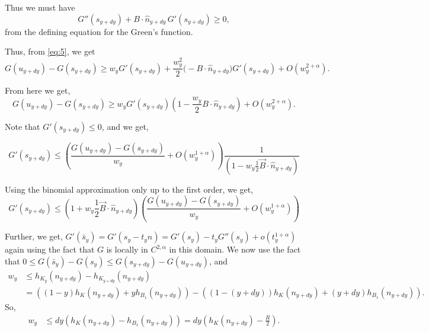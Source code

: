 \documentclass{article}
\theoremstyle{plain}
\theoremstyle{definition}
\theoremstyle{plain}
\begin{document}
Thus we must have
\[
G''(s_{y+dy}) + B \cdot \hat n_{y+dy} \, G'(s_{y+dy}) \ge 0,
\]
from the defining equation for the Green's function.

Thus, from \eqref{eq:5}, we get
\begin{equation}
G(u_{y+dy}) - G(s_{y+dy})
\ge w_y G'(s_{y+dy})
+ \frac{w_y^2}{2} \big(- B \cdot \hat n_{y+dy}\big) G'(s_{y+dy})
+ O(w_y^{2+\alpha}).
\label{eq:6}
\end{equation}

From here we get,
\begin{equation}
G(u_{y+dy}) - G(s_{y+dy})
\ge w_y G'(s_{y+dy})
\left( 1 - \frac{w_y}{2} B \cdot \hat n_{y+dy} \right)
+ O(w_y^{2+\alpha}).
\label{eq:7}
\end{equation}

Note that $G'(s_{y+dy}) \le 0$, and we get,


\begin{equation}
G'(s_{y+dy}) \le \left( \frac{G(u_{y+dy}) - G(s_{y+dy})}{w_y} + O(w_y^{1+\alpha}) \right) \frac{1}{\left( 1 - w_y \frac{1}{2} \vec{B} \cdot \hat{n}_{y+dy} \right)} \tag{5}
\end{equation}

Using the binomial approximation only up to the first order, we get,
\begin{equation*}
G'(s_{y+dy}) \le \left( 1 + w_y \frac{1}{2} \vec{B} \cdot \hat{n}_{y+dy} \right) \left( \frac{G(u_{y+dy}) - G(s_{y+dy})}{w_y} + O(w_y^{1+\alpha}) \right) \tag{5}
\end{equation*}

Further, we get, $G'(\bar{s}_y) = G'(s_y - t_y \hat{n}) = G'(s_y) - t_y G''(s_y) + o(t_y^{1+\alpha})$ again using the fact that $G$ is locally in $C^{2,\alpha}$ in this domain. 
We now use the fact that $0 \leq  G(\bar{s}_y) - G(s_y) \leq  G(s_{y+dy}) - G(u_{y+dy})$, and 
\begin{align*}
w_y &\le h_{K_y}(n_{y+dy}) - h_{K_{y+dy}}(n_{y+dy}) \\
&= \left( (1-y) h_K(n_{y+dy}) + y h_{B_1}(n_{y+dy}) \right) - \left( (1-(y+dy)) h_K(n_{y+dy}) + (y+dy) h_{B_1}(n_{y+dy}) \right).\end{align*}
So,
\begin{align*}w_y &\le dy (h_K(n_{y+dy}) - h_{B_1}(n_{y+dy})) = dy \left( h_K(n_{y+dy}) - \frac{R}{2} \right).
\end{align*}
\end{document}

